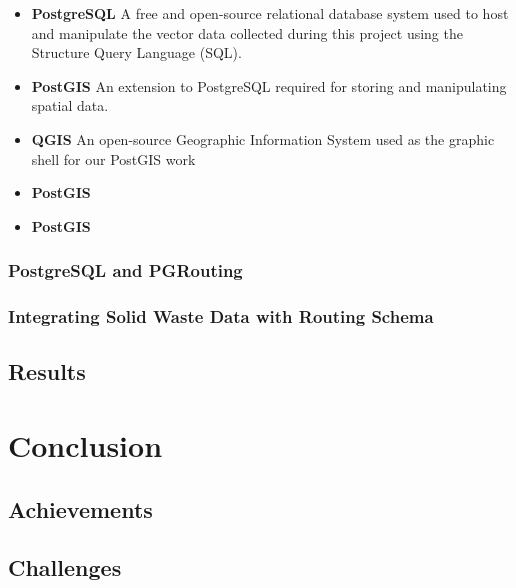 \documentclass[a4paper,12pt,twoside]{article}
\begin{document}
    \begin{itemize}
        \item \textbf{PostgreSQL}
        A free and open-source relational database system used to host and manipulate the vector data collected during this project using the Structure Query Language (SQL).
        \item \textbf{PostGIS}
        An extension to PostgreSQL required for storing and manipulating spatial data.  
        \item \textbf{QGIS}
        An open-source Geographic Information System used as the graphic shell for our PostGIS work
        \item \textbf{PostGIS}
        \item \textbf{PostGIS}
    \end{itemize}

\subsubsection{PostgreSQL and PGRouting}

\subsubsection{Integrating Solid Waste Data with Routing Schema}

\subsection{Results}

\section{Conclusion}

    \begin{multicols}{2}
    \lipsum[0-5]
    \end{multicols}

\subsection{Achievements}

    \begin{multicols}{2}
    \lipsum[0-5]
    \end{multicols}

\subsection{Challenges}
\end{document}

